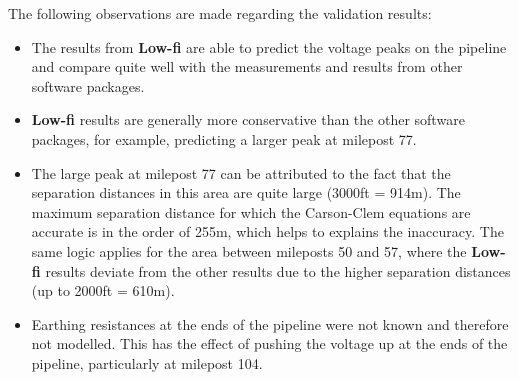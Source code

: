 \documentclass{article}
\begin{document}
The following observations are made regarding the validation results:
\begin{itemize}
\item The results from \textbf{Low-fi} are able to predict the voltage peaks on the pipeline and compare quite well with the measurements and results from other software packages.
\item \textbf{Low-fi} results are generally more conservative than the other software packages, for example, predicting a larger peak at milepost 77. 
\item The large peak at milepost 77 can be attributed to the fact that the separation distances in this area are quite large (3000ft = 914m). The maximum separation distance for which the Carson-Clem equations are accurate is in the order of 255m, which helps to explains the inaccuracy. The same logic applies for the area between mileposts 50 and 57, where the \textbf{Low-fi} results deviate from the other results due to the higher separation distances (up to 2000ft = 610m).
\item Earthing resistances at the ends of the pipeline were not known and therefore not modelled. This has the effect of pushing the voltage up at the ends of the pipeline, particularly at milepost 104.
\end{itemize}

\newpage


\end{document}
